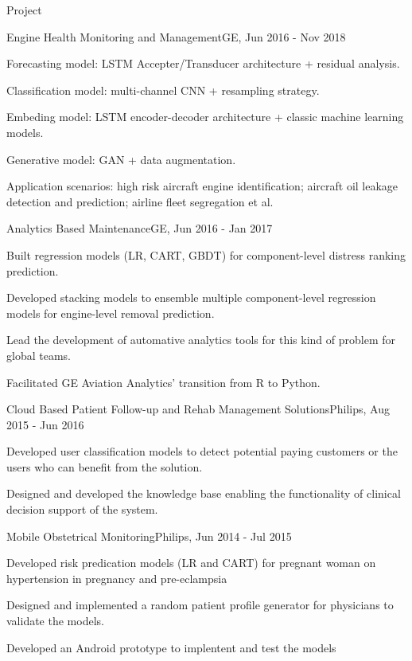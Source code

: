 \documentclass{resume} %
\begin{document}
\begin{rSection}{Project}

\begin{rSubsection}{Engine Health Monitoring and Management}{}{GE, Jun 2016 - Nov 2018}{}
\item Forecasting model: LSTM Accepter/Transducer architecture + residual analysis.
\item Classification model: multi-channel CNN + resampling strategy.
\item Embeding model: LSTM encoder-decoder architecture + classic machine learning models.
\item Generative model: GAN + data augmentation.
\item Application scenarios: high risk aircraft engine identification; aircraft oil leakage detection and prediction; airline fleet segregation et al.
\end{rSubsection}


\begin{rSubsection}{Analytics Based Maintenance}{}{GE, Jun 2016 - Jan 2017}{}
\item Built regression models (LR, CART, GBDT) for component-level distress ranking prediction.
\item Developed stacking models to ensemble multiple component-level regression models for engine-level removal prediction.
\item Lead the development of automative analytics tools for this kind of problem for global teams.
\item Facilitated GE Aviation Analytics' transition from R to Python.
\end{rSubsection}


\begin{rSubsection}{Cloud Based Patient Follow-up and Rehab Management Solutions}{}{Philips, Aug 2015 - Jun 2016}{}
\item Developed user classification models to detect potential paying customers or the users who can benefit from the solution.
\item Designed and developed the knowledge base enabling the functionality of clinical decision support of the system.
\end{rSubsection}


\begin{rSubsection}{Mobile Obstetrical Monitoring}{}{Philips, Jun 2014 - Jul 2015}{}
\item Developed risk predication models (LR and CART) for pregnant woman on hypertension in pregnancy and pre-eclampsia
\item Designed and implemented a random patient profile generator for physicians to validate the models.
\item Developed an Android prototype to implentent and test the models
\end{rSubsection}


\end{rSection}
\end{document}
